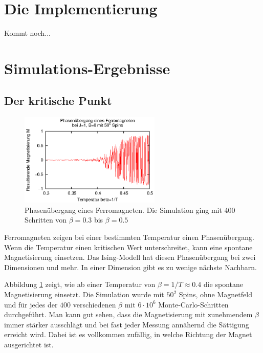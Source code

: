 \section{Die Implementierung}

Kommt noch...
\newpage

\section{Simulations-Ergebnisse}

\subsection{Der kritische Punkt}
\begin{figure}
  \includegraphics[width=0.6\textwidth]{bilder/critical/critical.eps}
  \caption{Phasenübergang eines Ferromagneten. Die Simulation ging mit 400 Schritten von $\beta=0.3$ bis $\beta=0.5$ \label{phase}}
\end{figure}
Ferromagneten zeigen bei einer bestimmten Temperatur einen Phasenübergang. Wenn die Temperatur einen kritischen Wert unterschreitet, kann eine spontane Magnetisierung einsetzen.
Das Ising-Modell hat diesen Phasenübergang bei zwei Dimensionen und mehr. In einer Dimension gibt es zu wenige nächste Nachbarn.

Abbildung \ref{phase} zeigt, wie ab einer Temperatur von $\beta=1/T\approx0.4$ die spontane Magnetisierung einsetzt.
Die Simulation wurde mit $50^2$ Spins, ohne Magnetfeld und für jedes der $400$ verschiedenen $\beta$ mit $6\cdot10^6$ Monte-Carlo-Schritten durchgeführt.
Man kann gut sehen, dass die Magnetisierung mit zunehmendem $\beta$ immer stärker ausschlägt und bei fast jeder Messung annähernd die Sättigung erreicht wird.
Dabei ist es vollkommen zufällig, in welche Richtung der Magnet ausgerichtet ist.


